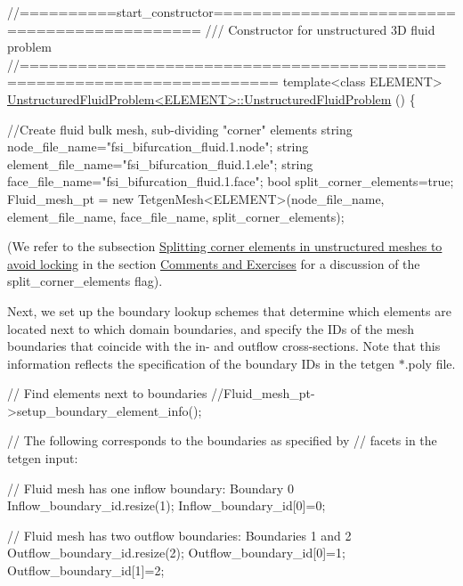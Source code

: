 \begin{DoxyCodeInclude}
\textcolor{comment}{//==========start\_constructor=============================================}
\textcolor{comment}{/// Constructor for unstructured 3D fluid problem}
\textcolor{comment}{}\textcolor{comment}{//========================================================================}
\textcolor{keyword}{template}<\textcolor{keyword}{class} ELEMENT>
\hyperlink{classUnstructuredFluidProblem_a9751f4afac540e148b3d90ae43dd5187}{UnstructuredFluidProblem<ELEMENT>::UnstructuredFluidProblem}
      ()
\{ 
 
 \textcolor{comment}{//Create fluid bulk mesh, sub-dividing "corner" elements}
 \textcolor{keywordtype}{string} node\_file\_name=\textcolor{stringliteral}{"fsi\_bifurcation\_fluid.1.node"};
 \textcolor{keywordtype}{string} element\_file\_name=\textcolor{stringliteral}{"fsi\_bifurcation\_fluid.1.ele"};
 \textcolor{keywordtype}{string} face\_file\_name=\textcolor{stringliteral}{"fsi\_bifurcation\_fluid.1.face"};
 \textcolor{keywordtype}{bool} split\_corner\_elements=\textcolor{keyword}{true};
 Fluid\_mesh\_pt =  \textcolor{keyword}{new} TetgenMesh<ELEMENT>(node\_file\_name,
                                          element\_file\_name,
                                          face\_file\_name,
                                          split\_corner\_elements);

\end{DoxyCodeInclude}


(We refer to the subsection \hyperlink{index_split}{Splitting corner elements in unstructured meshes to avoid locking} in the section \hyperlink{index_comm_ex}{Comments and Exercises} for a discussion of the {\ttfamily split\+\_\+corner\+\_\+elements} flag).

Next, we set up the boundary lookup schemes that determine which elements are located next to which domain boundaries, and specify the I\+Ds of the mesh boundaries that coincide with the in-\/ and outflow cross-\/sections. Note that this information reflects the specification of the boundary I\+Ds in the {\ttfamily tetgen} {\ttfamily $\ast$.poly} file.


\begin{DoxyCodeInclude}
 
 \textcolor{comment}{// Find elements next to boundaries}
 \textcolor{comment}{//Fluid\_mesh\_pt->setup\_boundary\_element\_info();}

 \textcolor{comment}{// The following corresponds to the boundaries as specified by}
 \textcolor{comment}{// facets in the tetgen input:}

 \textcolor{comment}{// Fluid mesh has one inflow boundary: Boundary 0}
 Inflow\_boundary\_id.resize(1);
 Inflow\_boundary\_id[0]=0;
 
 \textcolor{comment}{// Fluid mesh has two outflow boundaries: Boundaries 1 and 2}
 Outflow\_boundary\_id.resize(2);
 Outflow\_boundary\_id[0]=1;
 Outflow\_boundary\_id[1]=2;

\end{DoxyCodeInclude}



